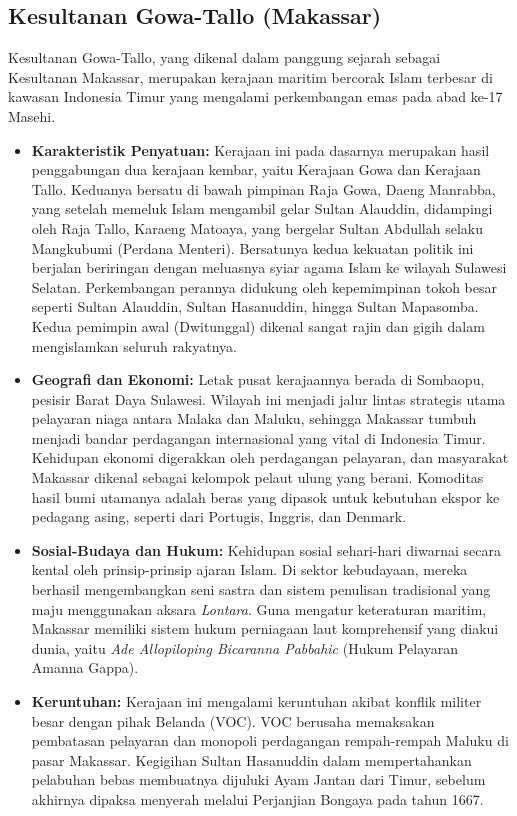 \documentclass[12pt, a4paper]{article}
\begin{document}
\subsection{Kesultanan Gowa-Tallo (Makassar)}
Kesultanan Gowa-Tallo, yang dikenal dalam panggung sejarah sebagai Kesultanan Makassar, merupakan kerajaan maritim bercorak Islam terbesar di kawasan Indonesia Timur yang mengalami perkembangan emas pada abad ke-17 Masehi.
\begin{itemize}
	\item \textbf{Karakteristik Penyatuan:} Kerajaan ini pada dasarnya merupakan hasil penggabungan dua kerajaan kembar, yaitu Kerajaan Gowa dan Kerajaan Tallo. Keduanya bersatu di bawah pimpinan Raja Gowa, Daeng Manrabba, yang setelah memeluk Islam mengambil gelar Sultan Alauddin, didampingi oleh Raja Tallo, Karaeng Matoaya, yang bergelar Sultan Abdullah selaku Mangkubumi (Perdana Menteri). Bersatunya kedua kekuatan politik ini berjalan beriringan dengan meluasnya syiar agama Islam ke wilayah Sulawesi Selatan. Perkembangan perannya didukung oleh kepemimpinan tokoh besar seperti Sultan Alauddin, Sultan Hasanuddin, hingga Sultan Mapasomba. Kedua pemimpin awal (Dwitunggal) dikenal sangat rajin dan gigih dalam mengislamkan seluruh rakyatnya.
	\item \textbf{Geografi dan Ekonomi:} Letak pusat kerajaannya berada di Sombaopu, pesisir Barat Daya Sulawesi. Wilayah ini menjadi jalur lintas strategis utama pelayaran niaga antara Malaka dan Maluku, sehingga Makassar tumbuh menjadi bandar perdagangan internasional yang vital di Indonesia Timur. Kehidupan ekonomi digerakkan oleh perdagangan pelayaran, dan masyarakat Makassar dikenal sebagai kelompok pelaut ulung yang berani. Komoditas hasil bumi utamanya adalah beras yang dipasok untuk kebutuhan ekspor ke pedagang asing, seperti dari Portugis, Inggris, dan Denmark.
	\item \textbf{Sosial-Budaya dan Hukum:} Kehidupan sosial sehari-hari diwarnai secara kental oleh prinsip-prinsip ajaran Islam. Di sektor kebudayaan, mereka berhasil mengembangkan seni sastra dan sistem penulisan tradisional yang maju menggunakan aksara \textit{Lontara}. Guna mengatur keteraturan maritim, Makassar memiliki sistem hukum perniagaan laut komprehensif yang diakui dunia, yaitu \textit{Ade Allopiloping Bicaranna Pabbahic} (Hukum Pelayaran Amanna Gappa).
	\item \textbf{Keruntuhan:} Kerajaan ini mengalami keruntuhan akibat konflik militer besar dengan pihak Belanda (VOC). VOC berusaha memaksakan pembatasan pelayaran dan monopoli perdagangan rempah-rempah Maluku di pasar Makassar. Kegigihan Sultan Hasanuddin dalam mempertahankan pelabuhan bebas membuatnya dijuluki Ayam Jantan dari Timur, sebelum akhirnya dipaksa menyerah melalui Perjanjian Bongaya pada tahun 1667.
\end{itemize}
\end{document}
